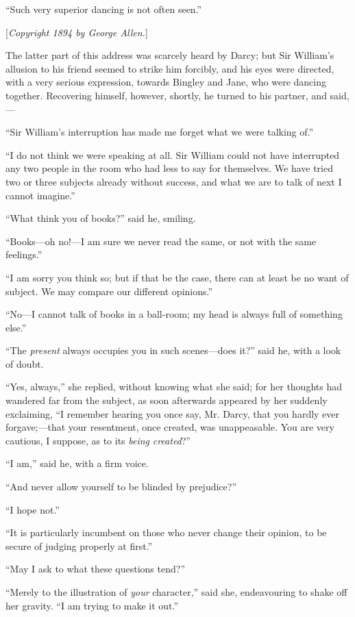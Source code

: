 \documentclass[12pt,openright]{book}
\begin{document}
“Such very superior dancing is not
often seen.”


[\textit{Copyright 1894 by George Allen.}]

The latter part of this address was scarcely heard by Darcy; but Sir William’s allusion to his friend seemed to strike him forcibly, and his eyes were directed, with a very serious expression, towards Bingley and Jane, who were dancing together. Recovering himself, however, shortly, he turned to his partner, and said,—

“Sir William’s interruption has made me forget what we were talking of.”

“I do not think we were speaking at all. Sir William could not have interrupted any two people in the room who had less to say for themselves. We have tried two or three subjects already without success, and what we are to talk of next I cannot imagine.”

“What think you of books?” said he, smiling.

“Books—oh no!—I am sure we never read the same, or not with the same feelings.”

“I am sorry you think so; but if that be the case, there can at least be no want of subject. We may compare our different opinions.”

“No—I cannot talk of books in a ball-room; my head is always full of something else.”

“The \textit{present} always occupies you in such scenes—does it?” said he, with a look of doubt.

“Yes, always,” she replied, without knowing what she said; for her thoughts had wandered far from the subject, as soon afterwards appeared by her suddenly exclaiming, “I remember hearing you once say, Mr. Darcy, that you hardly ever forgave;—that your resentment, once created, was unappeasable. You are very cautious, I suppose, as to its \textit{being}\textit{ }\textit{created}?”

“I am,” said he, with a firm voice.

“And never allow yourself to be blinded by prejudice?”

“I hope not.”

“It is particularly incumbent on those who never change their opinion, to be secure of judging properly at first.”

“May I ask to what these questions tend?”

“Merely to the illustration of \textit{your} character,” said she, endeavouring to shake off her gravity. “I am trying to make it out.”
\end{document}
